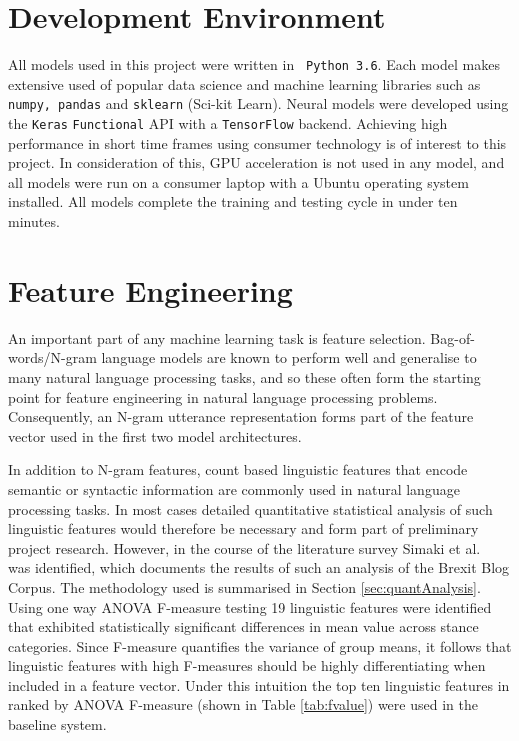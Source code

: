 \documentclass[Dissertation.tex]{subfiles}
\begin{document}
\section{Development Environment}
All models used in this project were written in \texttt{ Python 3.6}. Each model makes extensive used of popular data science and machine learning libraries such as \texttt{numpy, pandas} and \texttt{sklearn} (Sci-kit Learn). Neural models were developed using the \texttt{Keras} \texttt{Functional} API with a \texttt{TensorFlow} backend. Achieving high performance in short time frames using consumer technology is of interest to this project. In consideration of this, GPU acceleration is not used in any model, and all models were run on a consumer laptop with a Ubuntu operating system installed. All models complete the training and testing cycle in under ten minutes.

\section{Feature Engineering}
An important part of any machine learning task is feature selection. Bag-of-words/N-gram language models are known to perform well and generalise to many natural language processing tasks, and so these often form the starting point for feature engineering in natural language processing problems.  Consequently, an N-gram utterance representation forms part of the feature vector used in the first two model architectures.

In addition to N-gram features, count based linguistic features that encode semantic or syntactic information are commonly used in natural language processing tasks. In most cases detailed quantitative statistical analysis of such linguistic features would therefore be necessary  and form part of preliminary project research. However, in the course of the literature survey Simaki et al.\ \cite{simakiEvaluatingStanceannotatedSentences2018} was identified, which documents the results of such an analysis of the Brexit Blog Corpus. The methodology used is summarised in Section \ref{sec:quantAnalysis}.
Using one way ANOVA F-measure testing 19 linguistic features were identified that exhibited statistically significant differences in mean value across stance categories.  Since F-measure quantifies the variance of group means, it follows that linguistic features with high F-measures should be highly differentiating when included in a feature vector. Under this intuition the top ten linguistic features in \cite{simakiDetectionStanceRelatedCharacteristics2018} ranked by ANOVA F-measure (shown in Table \ref{tab:fvalue}) were used in the baseline system.
\end{document}
